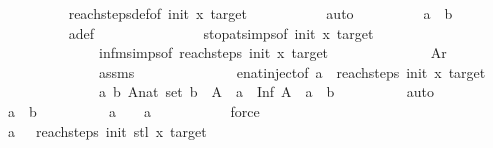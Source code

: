 \begin{isabellebody}
\ \ \ \ \ \ \ \ \isamarkupfalse%
\ reach{\isacharunderscore}{\kern0pt}steps{\isacharunderscore}{\kern0pt}def{\isacharbrackleft}{\kern0pt}of\ init\ x\ target{\isacharbrackright}{\kern0pt}\ \isanewline
\ \ \ \ \ \ \ \ \isamarkupfalse%
\ auto\isanewline
\ \ \ \ \ \ \isamarkupfalse%
\ \isamarkupfalse%
\ {\isachardoublequoteopen}a\ {\isasymle}\ {\isacharparenleft}{\kern0pt}b\ {\isacharplus}{\kern0pt}\ {}{\isacharparenright}{\kern0pt}{\isachardoublequoteclose}\isanewline
\ \ \ \ \ \ \ \ \isamarkupfalse%
\ a{\isacharunderscore}{\kern0pt}def\ \isanewline
\ \ \ \ \ \ \ \ \ \ \ \ \ \ stop{\isacharunderscore}{\kern0pt}at{\isachardot}{\kern0pt}simps{\isacharbrackleft}{\kern0pt}of\ init\ x\ target{\isacharbrackright}{\kern0pt}\ \isanewline
\ \ \ \ \ \ \ \ \ \ \ \ \ \ infm{\isachardot}{\kern0pt}simps{\isacharbrackleft}{\kern0pt}of\ {\isachardoublequoteopen}reach{\isacharunderscore}{\kern0pt}steps\ init\ x\ target{\isachardoublequoteclose}{\isacharbrackright}{\kern0pt}\isanewline
\ \ \ \ \ \ \ \ \ \ \ \ \ \ {\isacartoucheopen}Ar\ {\isasymnoteq}\ {\isacharbraceleft}{\kern0pt}{\isacharbraceright}{\kern0pt}{\isacartoucheclose}\isanewline
\ \ \ \ \ \ \ \ \ \ \ \ \ \ assms{\isacharparenleft}{\kern0pt}{}{\isacharparenright}{\kern0pt}\isanewline
\ \ \ \ \ \ \ \ \ \ \ \ \ \ enat{\isachardot}{\kern0pt}inject{\isacharbrackleft}{\kern0pt}of\ a\ {\isachardoublequoteopen}{\isasymSqinter}\ reach{\isacharunderscore}{\kern0pt}steps\ init\ x\ target{\isachardoublequoteclose}{\isacharbrackright}{\kern0pt}\isanewline
\ \ \ \ \ \ \ \ \ \ \ \ \ \ {\isacartoucheopen}{\isasymAnd}a\ b\ A{\isacharcolon}{\kern0pt}{\isacharcolon}{\kern0pt}nat\ set{\isachardot}{\kern0pt}\ b\ {\isasymin}\ A\ {\isasymLongrightarrow}\ a\ {\isacharequal}{\kern0pt}\ Inf\ A\ {\isasymLongrightarrow}\ a\ {\isasymle}\ b{\isacartoucheclose}\isanewline
\ \ \ \ \ \ \ \ \isamarkupfalse%
\ auto\isanewline
\ \ \ \ \ \ \isamarkupfalse%
\ \isamarkupfalse%
\ {\isachardoublequoteopen}a{\isacharprime}{\kern0pt}\ {\isasymle}\ b{\isachardoublequoteclose}\isanewline
\ \ \ \ \ \ \ \ \isamarkupfalse%
\ {\isacartoucheopen}a{\isacharprime}{\kern0pt}\ {\isacharplus}{\kern0pt}\ {}\ {\isacharequal}{\kern0pt}\ a{\isacartoucheclose}\ \isanewline
\ \ \ \ \ \ \ \ \isamarkupfalse%
\ force\isanewline
\ \ \ \ \isamarkupfalse%
\isanewline
\ \ \ \ \isamarkupfalse%
\ \isamarkupfalse%
\ {\isachardoublequoteopen}a{\isacharprime}{\kern0pt}\ {\isacharequal}{\kern0pt}\ {\isasymSqinter}\ {\isacharparenleft}{\kern0pt}reach{\isacharunderscore}{\kern0pt}steps\ init{\isacharprime}{\kern0pt}\ {\isacharparenleft}{\kern0pt}stl\ x{\isacharparenright}{\kern0pt}\ target{\isacharparenright}{\kern0pt}{\isachardoublequoteclose}\isanewline

\end{isabellebody}

